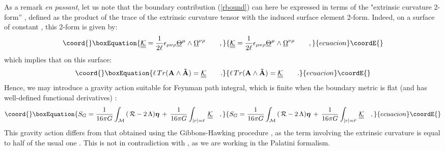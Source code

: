 \documentclass[a4paper,10pt]{article}
\begin{document}
As a remark {\it en passant}, let us note that the boundary contribution  
\coordHE{} (\ref{rbound})  
can here be expressed in terms of the  
"extrinsic curvature 2-form'' \coordHE{}, 
defined as the product of  
the trace of the extrinsic curvature tensor with the induced  
surface element 2-form. Indeed, on a surface of constant \coordHE{},  
this 2-form is  
given by: 
\begin{equation}\coord{}\boxEquation{ 
{\cal \underline {\underline {K}}}= \frac 1 {2 \ell} 
\epsilon_{\mu\nu\rho} \underline \Theta ^\mu \wedge  
\underline \Omega^{\nu\rho} \qquad , 
}{ 
{\cal \underline {\underline {K}}}= \frac 1 {2 \ell} 
\epsilon_{\mu\nu\rho} \underline \Theta ^\mu \wedge  
\underline \Omega^{\nu\rho} \qquad , 
}{ecuacion}\coordE{}\end{equation} 
which implies that on this surface: 
\begin{equation}\coord{}\boxEquation{ 
\ell \, Tr ({\bf A}\wedge {\bf \tilde A})=  
{\cal \underline{\underline{K}}} \qquad . 
}{ 
\ell \, Tr ({\bf A}\wedge {\bf \tilde A})=  
{\cal \underline{\underline{K}}} \qquad . 
}{ecuacion}\coordE{}\end{equation} 
Hence, we may introduce a gravity action \coordHE{} suitable for Feynman 
path integral, which  
is finite when the boundary metric is flat (and has well-defined 
functional derivatives) \cite{MB}: 
\begin{equation}\coord{}\boxEquation{ 
S_G = \frac 1 {16 \pi G} \int_{\cal M} \,  
   ( \, { \cal R} - 2 \, \Lambda ) 
       {\boldsymbol{\eta}} \, + \, \frac 1 {16 \pi G} 
\int_{|r|=\bar r} \, {\cal \underline {\underline {K}}} \quad , 
}{ 
S_G = \frac 1 {16 \pi G} \int_{\cal M} \,  
   ( \, { \cal R} - 2 \, \Lambda ) 
       {\boldsymbol{\eta}} \, + \, \frac 1 {16 \pi G} 
\int_{|r|=\bar r} \, {\cal \underline {\underline {K}}} \quad , 
}{ecuacion}\coordE{}\end{equation} 
This gravity action differs from that obtained using the 
Gibbons-Hawking procedure \cite{GH}, as  
the term involving the extrinsic 
curvature is equal to half of the usual one \cite{BAN}. This is not 
in contradiction with \cite{GH}, as we are working in the Palatini 
formalism. 
 
\end{document}
